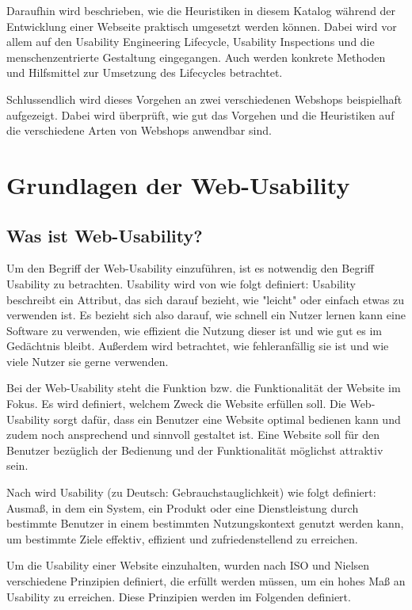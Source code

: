 \documentclass[utf8,biblatex]{lni}
\begin{document}
Daraufhin wird beschrieben, wie die Heuristiken in diesem Katalog während der Entwicklung einer Webseite praktisch umgesetzt werden können. Dabei wird vor allem auf den Usability Engineering Lifecycle, Usability Inspections und die menschenzentrierte Gestaltung eingegangen. Auch werden konkrete Methoden und Hilfsmittel zur Umsetzung des Lifecycles betrachtet.

Schlussendlich wird dieses Vorgehen an zwei verschiedenen Webshops beispielhaft aufgezeigt. Dabei wird überprüft, wie gut das Vorgehen und die Heuristiken auf die verschiedene Arten von Webshops anwendbar sind. 



\section{Grundlagen der Web-Usability} \label{chp:basics}


\subsection{Was ist Web-Usability?}
Um den Begriff der Web-Usability einzuführen, ist es notwendig den Begriff Usability zu betrachten. Usability wird von \cite[]{JakobNielsen.2022} wie folgt definiert: Usability beschreibt ein Attribut, das sich darauf bezieht, wie "leicht" oder einfach etwas zu verwenden ist. Es bezieht sich also darauf, wie schnell ein Nutzer lernen kann eine Software zu verwenden, wie effizient die Nutzung dieser ist und wie gut es im Gedächtnis bleibt. Außerdem wird betrachtet, wie fehleranfällig sie ist und wie viele Nutzer sie gerne verwenden.\cite[]{JakobNielsen.2022}

Bei der Web-Usability steht die Funktion bzw. die Funktionalität der Website im Fokus. Es wird definiert, welchem Zweck die Website erfüllen soll. Die Web-Usability sorgt dafür, dass ein Benutzer eine Website optimal bedienen kann und zudem noch ansprechend und sinnvoll gestaltet ist. Eine Website soll für den Benutzer bezüglich der Bedienung und der Funktionalität möglichst attraktiv sein. 

Nach \cite[]{DINDeutschesInstitutfurNormunge.V..g} wird Usability (zu Deutsch: Gebrauchstauglichkeit) wie folgt definiert: \glqq Ausmaß, in dem ein System, ein Produkt oder eine Dienstleistung durch bestimmte Benutzer in einem
bestimmten Nutzungskontext genutzt werden kann, um bestimmte Ziele effektiv, effizient und
zufriedenstellend zu erreichen\grqq.

Um die Usability einer Website einzuhalten, wurden nach ISO und Nielsen verschiedene Prinzipien definiert, die erfüllt werden müssen, um ein hohes Maß an Usability zu erreichen. Diese Prinzipien werden im Folgenden definiert.
\end{document}
